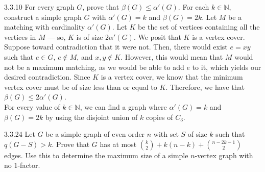 \documentclass[10pt]{extarticle}
\title{}
\author{Avinash Iyer}
\date{}
\begin{document}
{
  \begin{problem}{3.3.10}
    For every graph $G$, prove that $\beta(G) \leq \alpha'(G)$. For each $k\in \mathbb{N}$, construct a simple graph $G$ with $\alpha'(G) = k$ and $\beta(G) = 2k$.
    \tcblower
    Let $M$ be a matching with cardinality $\alpha'(G)$. Let $K$ be the set of vertices containing all the vertices in $M$ --- so, $K$ is of size $2\alpha'(G)$. We posit that $K$ is a vertex cover. Suppose toward contradiction that it were not. Then, there would exist $e=xy$ such that $e\in G$, $e\notin M$, and $x,y\notin K$. However, this would mean that $M$ would not be a maximum matching, as we would be able to add $e$ to it, which yields our desired contradiction. Since $K$ is a vertex cover, we know that the minimum vertex cover must be of size less than or equal to $K$. Therefore, we have that $\beta(G) \leq 2\alpha'(G)$.\\

    For every value of $k\in \mathbb{N}$, we can find a graph where $\alpha'(G) = k$ and $\beta(G) = 2k$ by using the disjoint union of $k$ copies of $C_3$.
  \end{problem}
  \begin{problem}{3.3.24}
    Let $G$ be a simple graph of even order $n$ with set $S$ of size $k$ such that $q(G-S) > k$. Prove that $G$ has at most ${k\choose 2} + k(n-k) + {n-2k-1 \choose 2}$ edges. Use this to determine the maximum size of a simple $n$-vertex graph with no $1$-factor.
  \end{problem}
}
\end{document}
